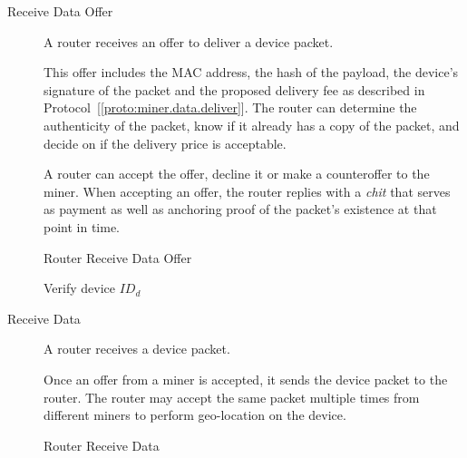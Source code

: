 \documentclass[10pt, nonatbib, nocopyrightspace, reprint]{sigplanconf}
\begin{document}
\begin{description}

    \item [Receive Data Offer] A router receives an offer to deliver a device packet.

      This offer includes the MAC address, the hash of the payload, the device's signature of the packet and the proposed delivery fee as described in Protocol~[\ref{proto:miner.data.deliver}]. The router can determine the authenticity of the packet, know if it already has a copy of the packet, and decide on if the delivery price is acceptable.

      A router can accept the offer, decline it or make a counteroffer to the miner. When accepting an offer, the router replies with a \emph{chit} that serves as payment as well as anchoring proof of the packet's existence at that point in time.

    \begin{algorithm}[!htb]
      \DontPrintSemicolon
      \caption{Router Receive Data Offer}\label{proto:router.offer.recv}

       {
        Verify device $ID_d$ \;
      }
    \end{algorithm}
    \FloatBarrier


    \item [Receive Data] A router receives a device packet.

      Once an offer from a miner is accepted, it sends the device packet to the router. The router may accept the same packet multiple times from different miners to perform geo-location on the device.

    \begin{algorithm}[!htb]
      \DontPrintSemicolon
      \caption{Router Receive Data }\label{proto:router.data.recv}


\end{algorithm}
\end{description}
\end{document}
